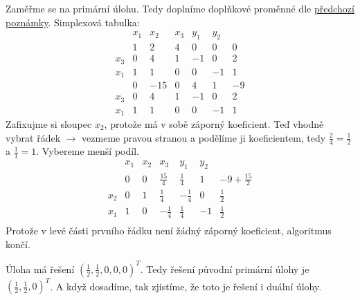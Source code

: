Zaměřme se na primární úlohu.
Tedy doplníme doplňkové proměnné dle \hyperref[simplDual]{předchozí poznámky}.
Simplexová tabulka:
\[
    \begin{array}{c|rrrrr|r}
           &x_1 & x_2 & x_3 & y_1 & y_2 &  \\
           & 1 & 2 & 4 & 0 & 0 & 0 \\ \hline
        x_3& 0 & 4 & 1 &-1 & 0 & 2 \\
        x_1& 1 & 1 & 0 & 0 &-1 & 1 \\
           & 0 &-15& 0 & 4 & 1 & -9\\ \hline
        x_3& 0 & 4 & 1 &-1 & 0 & 2 \\
        x_1& 1 & 1 & 0 & 0 &-1 & 1
    \end{array}
\]
Zafixujme si sloupec $x_2$, protože má v sobě záporný koeficient. Teď vhodně vybrat řádek $\rightarrow$ vezmeme pravou 
stranou a podělíme ji koeficientem, tedy $\frac{2}{4}=\frac{1}{2}$ a $\frac{1}{1}=1$. Vybereme menší podíl.
\[
    \begin{array}{c|rrrrr|r}
           &x_1 & x_2 & x_3 & y_1 & y_2 &  \\
           & 0 & 0 & \frac{15}{4} & \frac{1}{4} & 1 & -9 + \frac{15}{2}\\ \hline
        x_2& 0 & 1 & \frac{1}{4} &-\frac{1}{4} & 0 & \frac{1}{2} \\
        x_1& 1 & 0 & -\frac{1}{4} & \frac{1}{4} &-1 & \frac{1}{2} \\
    \end{array}
\]
Protože v levé části prvního řádku není žádný záporný koeficient, algoritmus končí.

Úloha má řešení $\left(\frac{1}{2}, \frac{1}{2}, 0, 0, 0 \right)^T$. Tedy řešení původní primární úlohy je 
$\left(\frac{1}{2}, \frac{1}{2}, 0\right)^T$. A když dosadíme, tak zjistíme, že toto je řešení i duální úlohy.